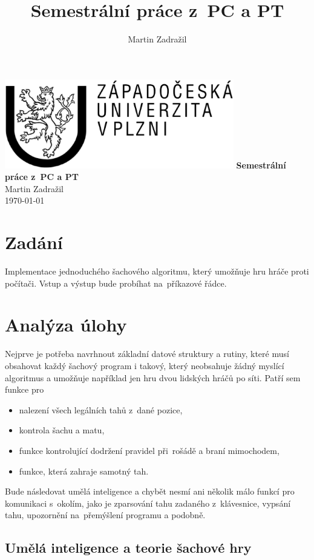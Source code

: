 \documentclass[11pt, titlepage]{article}
\author{Martin Zadražil}
\title{Semestrální práce z~PC a PT}
\begin{document}
\begin{titlepage}
	\begin{center}
		\includegraphics[width=10cm]{zculogo.ps}
		\vskip 5cm
		{\huge \bfseries Semestrální práce z~PC a PT} \\
		\vskip 1cm
		{ \large Martin Zadražil} \\
		{ \large \today }
	\end{center}
\end{titlepage}

\tableofcontents
\newpage

\section{Zadání}

Implementace jednoduchého šachového algoritmu, který umožňuje hru hráče proti počítači. Vstup a výstup bude probíhat na~příkazové řádce.

\section{Analýza úlohy}

Nejprve je potřeba navrhnout základní datové struktury a rutiny, které musí obsahovat každý šachový program i takový, který neobsahuje žádný myslící algoritmus a umožňuje například jen hru dvou lidských hráčů po síti. Patří sem funkce pro
\begin{itemize}
	\item nalezení všech legálních tahů z~dané pozice,
	\item kontrola šachu a matu,
	\item funkce kontrolující dodržení pravidel při~rošádě a braní mimochodem,
	\item funkce, která zahraje samotný tah.
\end{itemize}
Bude následovat umělá inteligence a chybět nesmí ani několik málo funkcí pro komunikaci s~okolím, jako je zparsování tahu zadaného z~klávesnice, vypsání tahu, upozornění na~přemýšlení programu a podobně.

\subsection{Umělá inteligence a teorie šachové hry}
\end{document}
